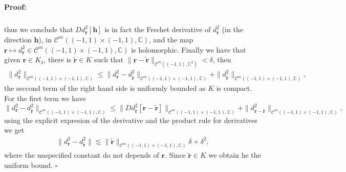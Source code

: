 \documentclass{article}
\newenvironment{proof}{\paragraph{Proof:}}{\hfill$\square$}
\newcommand{\IC}{{\mathbb C}}
\newcommand{\cmspace}[3]{\mathcal{C}^{#1} \left( #2, #3 \right)}
\newcommand{\bh}{\bm{h}}
\newcommand{\br}{\bm{r}}
\newcommand{\iinterv}{(-1,1)\times(-1,1)}
\begin{document}
\begin{proof}
\begin{align*}
\end{align*} 
thus we conclude that $D d_{\br}^2[\bh]$ is in fact the Frechet derivative of $d^2_{\br}$ (in the direction $\bh$), in $\cmspace{m}{\iinterv}{\IC}$, and the map $\br  \mapsto d_{\br}^2 \in \cmspace{m}{(-1,1)\times(-1,1)}{\IC}$ is holomorphic. Finally we have that given $\br \in K_\delta$, there is $\widetilde{\br} \in K$ such that $\| \br - \widetilde{\br}\|_{\cmspace{m}{(-1,1)}{\IC^2}} < \delta$, then 
\begin{align*}
\| d^2_{\br} \|_{\cmspace{m}{\iinterv}{\IC}} \leq \| d^2_{\br}  - d_{\widetilde{\br}}^2 \|_{\cmspace{m}{\iinterv}{\IC}}  + \| d_{\widetilde{\br}}^2 \|_{\cmspace{m}{\iinterv}{\IC}},
\end{align*}
the seccond term of the right hand side is uniformly bounded as $K$ is compact. For the first term we have
$$\| d^2_{\br}  - d_{\widetilde{\br}}^2 \|_{\cmspace{m}{\iinterv}{\IC}} \leq 
\|D d^2_{\widetilde{\br}}[\br - \widetilde{\br}]\|_{\cmspace{m}{\iinterv}{\IC}} + \| d^2_{\br -\widetilde{\br}}\|_{\cmspace{m}{\iinterv}{\IC}},$$
 using the explicit expresion of the derivative and the product rule for derivatives we get
\begin{align*}
\| d^2_{\br}  - d_{\widetilde{\br}}^2 \| \lesssim 
\|\widetilde{\br}\|_{\cmspace{m}{\iinterv}{\IC}} \delta  + \delta^2,
\end{align*}
where the unspecified constant do not depends of $\br$. Since $\widetilde{\br} \in K$ we obtain he the uniform bound. 
\end{proof}
\end{document}
